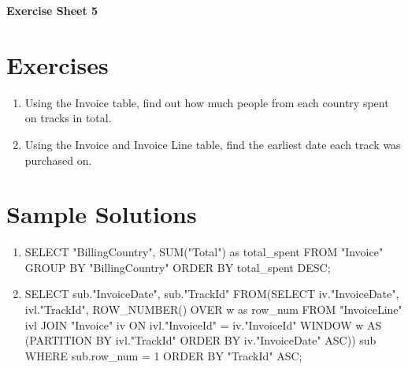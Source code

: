 \documentclass[USenglish,final,authoryear,12pt]{article}
\begin{document}
\textbf{\LARGE Exercise Sheet 5}\newline
\section{Exercises}
\begin{enumerate}
	\item Using the Invoice table, find out how much people from each country spent on tracks in total.
	\item Using the Invoice and Invoice Line table, find the earliest date each track was purchased on.
\end{enumerate}
\pagebreak

\section{Sample Solutions}
\begin{enumerate}
	\item SELECT "BillingCountry",\newline
	SUM("Total") as total\_spent\newline
	FROM "Invoice"\newline
	GROUP BY "BillingCountry"\newline
	ORDER BY total\_spent DESC;
	\item SELECT sub."InvoiceDate",\newline
	sub."TrackId"\newline
	FROM(SELECT iv."InvoiceDate",\newline
	ivl."TrackId",\newline
	ROW\_NUMBER() OVER w as row\_num\newline
	FROM "InvoiceLine" ivl\newline
	JOIN "Invoice" iv\newline
	ON ivl."InvoiceId" = iv."InvoiceId"\newline
	WINDOW w AS (PARTITION BY ivl."TrackId" ORDER BY iv."InvoiceDate" ASC)) sub\newline
	WHERE sub.row\_num = 1\newline
	ORDER BY "TrackId" ASC;
\end{enumerate}
\end{document}
